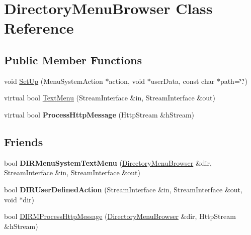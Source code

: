 \hypertarget{classDirectoryMenuBrowser}{
\section{DirectoryMenuBrowser Class Reference}
\label{classDirectoryMenuBrowser}
}
\subsection*{Public Member Functions}
\begin{DoxyCompactItemize}
\item 
void \hyperlink{classDirectoryMenuBrowser_a5bdd2f9fb925790dd4e08617b60d066d}{SetUp} (MenuSystemAction $\ast$action, void $\ast$userData, const char $\ast$path=\char`\"{}.\char`\"{})
\item 
virtual bool \hyperlink{classDirectoryMenuBrowser_a9c0b2bb9b511a604ba38c615045c9f15}{TextMenu} (StreamInterface \&in, StreamInterface \&out)
\item 
\hypertarget{classDirectoryMenuBrowser_a0da24dcaedb5fe75a11fa61f4018b4c3}{
virtual bool {\bfseries ProcessHttpMessage} (HttpStream \&hStream)}
\label{classDirectoryMenuBrowser_a0da24dcaedb5fe75a11fa61f4018b4c3}

\end{DoxyCompactItemize}
\subsection*{Friends}
\begin{DoxyCompactItemize}
\item 
\hypertarget{classDirectoryMenuBrowser_ac9fad7372844b75a86dfa4667fc05740}{
bool {\bfseries DIRMenuSystemTextMenu} (\hyperlink{classDirectoryMenuBrowser}{DirectoryMenuBrowser} \&dir, StreamInterface \&in, StreamInterface \&out)}
\label{classDirectoryMenuBrowser_ac9fad7372844b75a86dfa4667fc05740}

\item 
\hypertarget{classDirectoryMenuBrowser_abd80802f2f38a2fa5362a8567979bc9e}{
bool {\bfseries DIRUserDefinedAction} (StreamInterface \&in, StreamInterface \&out, void $\ast$dir)}
\label{classDirectoryMenuBrowser_abd80802f2f38a2fa5362a8567979bc9e}

\item 
bool \hyperlink{classDirectoryMenuBrowser_aedce0dcf59ae7a4a7d32f2696e86ba11}{DIRMProcessHttpMessage} (\hyperlink{classDirectoryMenuBrowser}{DirectoryMenuBrowser} \&dir, HttpStream \&hStream)
\end{DoxyCompactItemize}


